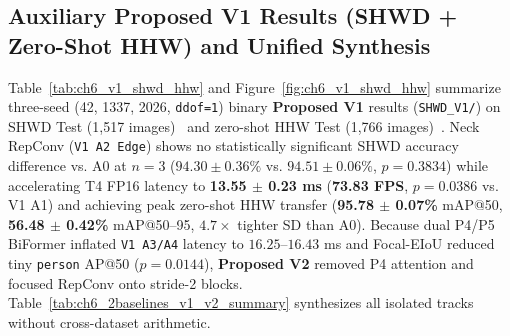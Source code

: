 \subsection{Auxiliary Proposed V1 Results (SHWD + Zero-Shot HHW) and Unified Synthesis}

Table~\ref{tab:ch6_v1_shwd_hhw} and Figure~\ref{fig:ch6_v1_shwd_hhw} summarize three-seed (42, 1337, 2026, \texttt{ddof=1}) binary \textbf{Proposed V1} results (\texttt{SHWD\_V1/}) on SHWD Test (1,517 images)~\cite{shwd_dataset} and zero-shot HHW Test (1,766 images)~\cite{hard_hat_workers_mvd}. Neck RepConv (\texttt{V1 A2 Edge}) shows no statistically significant SHWD accuracy difference vs. A0 at $n=3$ ($94.30 \pm 0.36\%$ vs. $94.51 \pm 0.06\%$, $p=0.3834$) while accelerating T4 FP16 latency to \textbf{13.55 $\pm$ 0.23 ms} (\textbf{73.83 FPS}, $p=0.0386$ vs. V1 A1) and achieving peak zero-shot HHW transfer (\textbf{95.78 $\pm$ 0.07\%} mAP@50, \textbf{56.48 $\pm$ 0.42\%} mAP@50--95, $4.7\times$ tighter SD than A0). Because dual P4/P5 BiFormer inflated \texttt{V1 A3/A4} latency to $16.25\text{--}16.43$ ms and Focal-EIoU reduced tiny \texttt{person} AP@50 ($p=0.0144$), \textbf{Proposed V2} removed P4 attention and focused RepConv onto stride-2 blocks. Table~\ref{tab:ch6_2baselines_v1_v2_summary} synthesizes all isolated tracks without cross-dataset arithmetic.

